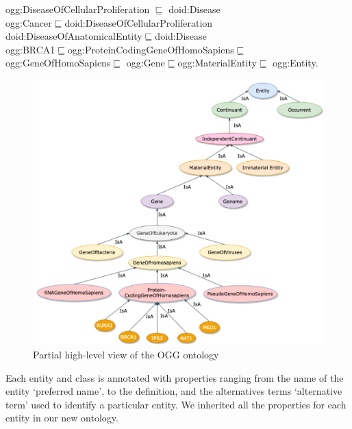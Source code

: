 \vspace{-4mm}
{\scriptsize \noindent ogg:DiseaseOfCellularProliferation $\sqsubseteq$ doid:Disease\\
ogg:Cancer$\sqsubseteq$doid:DiseaseOfCellularProliferation\\
doid:DiseaseOfAnatomicalEntity$\sqsubseteq$doid:Disease\\
ogg:BRCA1$\sqsubseteq$ogg:ProteinCodingGeneOfHomoSapiens$\sqsubseteq$ogg:GeneOfHomoSapiens$\sqsubseteq$ ogg:Gene$\sqsubseteq$ogg:MaterialEntity$\sqsubseteq$ ogg:Entity.}\\

\vspace{-2mm}
\begin{figure}
	\centering
	\includegraphics[scale=0.5]{images/go.png}
	\caption{Partial high-level view of the OGG ontology} 
	\label{fig:ogg_ontology}
	\vspace{-2mm}
\end{figure}

\vspace{-2mm}
\hspace*{3.5mm} Each entity and class is annotated with properties ranging from the name of the entity `preferred name', to the definition, and the alternatives terms `alternative term' used to identify a particular entity. We inherited all the properties for each entity in our new ontology.

